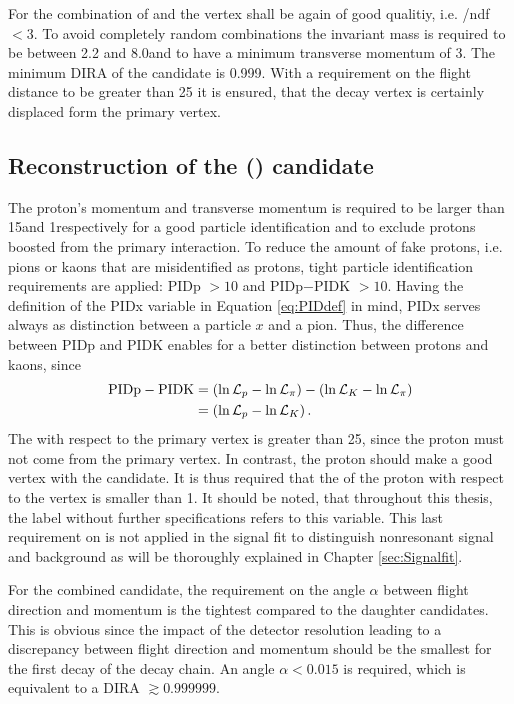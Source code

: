 For the combination of \Dz and \mun the vertex shall be again of good qualitiy, i.e. \chisqvtx/ndf $<3$.
To avoid completely random combinations the invariant \Dz\mun mass is required to be between 2.2 and 8.0\gev and to have a minimum transverse momentum of 3\gev.
The minimum DIRA of the \Dz\mun candidate is 0.999.
With a requirement on the flight distance \chisq to be greater than 25 it is ensured, that the \Dz\mun decay vertex is certainly displaced form the primary vertex.

\subsection{Reconstruction of the \Lb (\Dz\mun\proton) candidate}
\label{sec:Selection_D0pmu}
The proton's momentum and transverse momentum is required to be larger than 15\gev and 1\gev respectively for a good particle identification and to exclude protons boosted from the primary interaction.
To reduce the amount of fake protons, i.e. pions or kaons that are misidentified as protons, tight particle identification requirements are applied: PIDp $> 10$ and PIDp$-$PIDK $> 10$.
Having the definition of the PIDx variable in Equation \ref{eq:PIDdef} in mind, PIDx serves always as distinction between a particle $x$ and a pion.
Thus, the difference between PIDp and PIDK enables for a better distinction between protons and kaons, since
\begin{align*}
    \text{PIDp}-\text{PIDK} &= \left(\ln \mathcal{L}_{{p}} - \ln \mathcal{L}_{\pi}\right) - \left(\ln \mathcal{L}_{{K}} - \ln \mathcal{L}_{\pi}\right) \\
    & = \left(\ln \mathcal{L}_{{p}} - \ln \mathcal{L}_{{K}}\right).
\end{align*}
The \chisqip with respect to the primary vertex is greater than 25, since the proton must not come from the primary vertex.
In contrast, the proton should make a good vertex with the \Dz\mun candidate.
It is thus required that the \logIP of the proton with respect to the \Dz\mun vertex is smaller than 1.
It should be noted, that throughout this thesis, the label \logIP without further specifications refers to this variable.
This last requirement on \logIP is not applied in the signal fit to distinguish nonresonant signal and background as will be thoroughly explained in Chapter \ref{sec:Signalfit}.

For the combined \Dz\mun\proton candidate, the requirement on the angle $\alpha$ between flight direction and momentum is the tightest compared to the daughter candidates.
This is obvious since the impact of the detector resolution leading to a discrepancy between flight direction and momentum should be the smallest for the first decay of the decay chain.
An angle $\alpha < 0.015$ is required, which is equivalent to a DIRA $\gtrsim 0.999999$.

